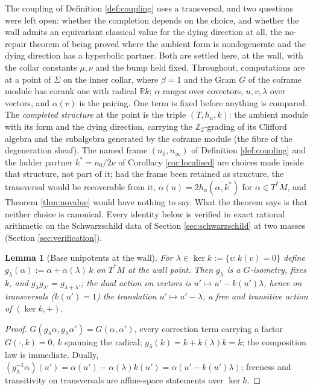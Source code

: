\documentclass[11pt]{article}
\newtheorem{lemma}[theorem]{Lemma}
\theoremstyle{definition}
\newcommand{\R}{\mathbb{R}}
\newcommand{\Sig}{\Sigma}
\newcommand{\nO}{n_0}
\newcommand{\nInf}{n_\infty}
\begin{document}
The coupling of Definition \ref{def:coupling} uses a transversal, and two questions were left open: whether the completion depends on the choice, and whether the wall admits an equivariant classical value for the dying direction at all, the no-repair theorem of \cite[Thm.~4.2]{ButlerT1} being proved where the ambient form is nondegenerate and the dying direction has a hyperbolic partner. Both are settled here, at the wall, with the collar constants $\mu, \nu$ and the bump held fixed. Throughout, computations are at a point of $\Sig$ on the inner collar, where $\beta = 1$ and the Gram $G$ of the coframe module has corank one with radical $\R k$; $\alpha$ ranges over covectors, $u, v, \lambda$ over vectors, and $\alpha(v)$ is the pairing. One term is fixed before anything is compared. The \emph{completed structure} at the point is the triple $(T, h_u, k)$: the ambient module with its form and the dying direction, carrying the $\mathbb{Z}_2$-grading of its Clifford algebra and the subalgebra generated by the coframe module (the fibre of the degeneration sheaf). The named frame $(\nO, \nInf)$ of Definition \ref{def:coupling} and the ladder partner $k^* = \nO/2\nu$ of Corollary \ref{cor:localised} are choices made inside that structure, not part of it; had the frame been retained as structure, the transversal would be recoverable from it, $\alpha(u) = 2h_u(\alpha, k^*)$ for $\alpha \in T^*M$, and Theorem \ref{thm:novalue} would have nothing to say. What the theorem says is that neither choice is canonical. Every identity below is verified in exact rational arithmetic on the Schwarzschild data of Section \ref{sec:schwarzschild} at two masses (Section \ref{sec:verification}).

\begin{lemma}[Base unipotents at the wall]\label{lem:wallunipotents}
For $\lambda \in \ker k := \{v : k(v) = 0\}$ define $g_\lambda(\alpha) := \alpha + \alpha(\lambda)\,k$ on $T^*M$ at the wall point. Then $g_\lambda$ is a $G$-isometry, fixes $k$, and $g_\lambda g_{\lambda'} = g_{\lambda+\lambda'}$; the dual action on vectors is $u' \mapsto u' - k(u')\lambda$, hence on transversals ($k(u') = 1$) the translation $u' \mapsto u' - \lambda$, a free and transitive action of $(\ker k, +)$.
\end{lemma}

\begin{proof}
$G(g_\lambda\alpha, g_\lambda\alpha') = G(\alpha, \alpha')$, every correction term carrying a factor $G(\cdot, k) = 0$, $k$ spanning the radical; $g_\lambda(k) = k + k(\lambda)k = k$; the composition law is immediate. Dually, $(g_\lambda^{-1}\alpha)(u') = \alpha(u') - \alpha(\lambda)k(u') = \alpha(u' - k(u')\lambda)$; freeness and transitivity on transversals are affine-space statements over $\ker k$.
\end{proof}
\end{document}

